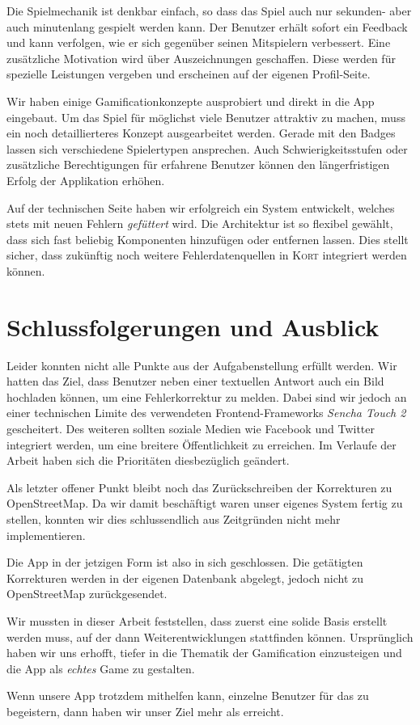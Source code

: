 Die Spielmechanik ist denkbar einfach, so dass das Spiel auch nur sekunden- aber auch  minutenlang gespielt werden kann.
Der Benutzer erhält sofort ein Feedback und kann verfolgen, wie er sich gegenüber seinen Mitspielern verbessert.
Eine zusätzliche Motivation wird über Auszeichnungen geschaffen.
Diese werden für spezielle Leistungen vergeben und erscheinen auf der eigenen Profil-Seite.

Wir haben einige Gamificationkonzepte ausprobiert und direkt in die App eingebaut.
Um das Spiel für möglichst viele Benutzer attraktiv zu machen, muss ein noch detaillierteres Konzept ausgearbeitet werden.
Gerade mit den Badges lassen sich verschiedene Spielertypen ansprechen.
Auch Schwierigkeitsstufen oder zusätzliche Berechtigungen für erfahrene Benutzer können den längerfristigen Erfolg der Applikation erhöhen.

Auf der technischen Seite haben wir erfolgreich ein System entwickelt, welches stets mit neuen Fehlern \emph{gefüttert} wird.
Die Architektur ist so flexibel gewählt, dass sich fast beliebig Komponenten hinzufügen oder entfernen lassen.
Dies stellt sicher, dass zukünftig noch weitere Fehlerdatenquellen in \textsc{Kort} integriert werden können.

\section{Schlussfolgerungen und Ausblick}
Leider konnten nicht alle Punkte aus der Aufgabenstellung erfüllt werden.
Wir hatten das Ziel, dass Benutzer neben einer textuellen Antwort auch ein Bild hochladen können, um eine Fehlerkorrektur zu melden.
Dabei sind wir jedoch an einer technischen Limite des verwendeten Frontend-Frameworks \emph{Sencha Touch 2} gescheitert.
Des weiteren sollten soziale Medien wie Facebook und Twitter integriert werden, um eine breitere Öffentlichkeit zu erreichen.
Im Verlaufe der Arbeit haben sich die Prioritäten diesbezüglich geändert.

Als letzter offener Punkt bleibt noch das Zurückschreiben der Korrekturen zu \gls{OpenStreetMap}.
Da wir damit beschäftigt waren unser eigenes System fertig zu stellen, konnten wir dies schlussendlich aus Zeitgründen nicht mehr implementieren.

Die App in der jetzigen Form ist also in sich geschlossen. Die getätigten Korrekturen werden in der eigenen Datenbank abgelegt, jedoch nicht zu \gls{OpenStreetMap} zurückgesendet.

Wir mussten in dieser Arbeit feststellen, dass zuerst eine solide Basis erstellt werden muss, auf der dann Weiterentwicklungen stattfinden können.
Ursprünglich haben wir uns erhofft, tiefer in die Thematik der \gls{Gamification} einzusteigen und die App als \emph{echtes} Game zu gestalten.

Wenn unsere App trotzdem mithelfen kann, einzelne Benutzer für das  zu begeistern, dann haben wir unser  Ziel mehr als erreicht.